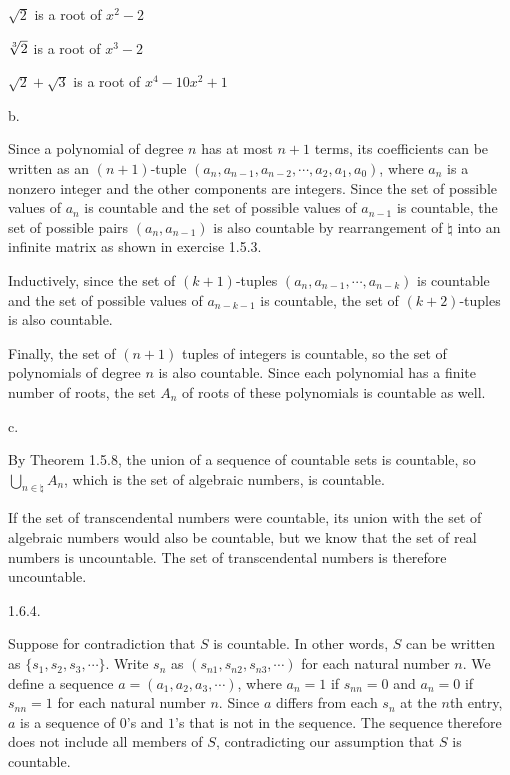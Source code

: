 $\sqrt 2$ is a root of $x^2 - 2$

$\root 3 \of 2$ is a root of $x^3 - 2$

$\sqrt 2 + \sqrt 3$ is a root of $x^4 - 10x^2 + 1$

\item{} b.

Since a polynomial of degree $n$ has at most $n + 1$ terms,
its coefficients can be written as an $(n + 1)$-tuple
$(a_n, a_{n - 1}, a_{n - 2}, \cdots, a_2, a_1, a_0)$,
where $a_n$ is a nonzero integer and the other components are integers.
Since the set of possible values of $a_n$ is countable
and the set of possible values of $a_{n - 1}$ is countable,
the set of possible pairs $(a_n, a_{n - 1})$ is also countable
by rearrangement of $\natural$ into an infinite matrix
as shown in exercise 1.5.3.

Inductively, since the set of $(k + 1)$-tuples
$(a_n, a_{n - 1}, \cdots, a_{n - k})$ is countable
and the set of possible values of $a_{n - k - 1}$ is countable,
the set of $(k + 2)$-tuples is also countable.

Finally, the set of $(n + 1)$ tuples of integers is countable,
so the set of polynomials of degree $n$ is also countable.
Since each polynomial has a finite number of roots,
the set $A_n$ of roots of these polynomials is countable as well.

\item{} c.

By Theorem 1.5.8, the union of a sequence of countable sets is countable,
so $\bigcup _{n \in \natural} A_n$, which is the set of algebraic numbers,
is countable.

If the set of transcendental numbers were countable,
its union with the set of algebraic numbers would also be countable,
but we know that the set of real numbers is uncountable.
The set of transcendental numbers is therefore uncountable.

\item{1.6.4.}

Suppose for contradiction that $S$ is countable.
In other words, $S$ can be written as $\{s_1, s_2, s_3, \cdots\}$.
Write $s_n$ as $(s_{n1}, s_{n2}, s_{n3}, \cdots)$ for each natural number
$n$.
We define a sequence $a = (a_1, a_2, a_3, \cdots)$, where $a_n = 1$
if $s_{nn} = 0$ and $a_n = 0$ if $s_{nn} = 1$ for each natural number $n$.
Since $a$ differs from each $s_n$ at the $n$th entry,
$a$ is a sequence of $0$'s and $1$'s that is not in the sequence.
The sequence therefore does not include all members of $S$,
contradicting our assumption that $S$ is countable.

